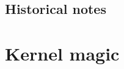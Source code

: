 \documentclass[openany]{tufte-book} %
\theoremstyle{plain}
\newtheorem{theorem}{Theorem}
\newcommand{\set}[1]{\left\{ #1 \right\}}
\newcommand{\card}[1]{\left|#1\right|}
\begin{document}
%
%
%

\section{Historical notes}

\chapter{Kernel magic}\label{KernelMagicChapter}
\end{document}

